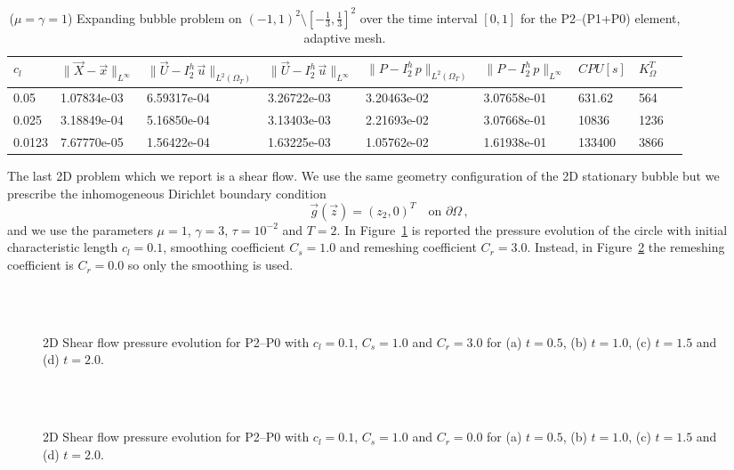 \documentclass[a4paper,12pt,onecolumn]{article}
\newcommand{\errorXx}{\|\vec{X} - \vec{x}\|_{L^\infty}}
\newcommand{\LerrorUu}[1]{\|\vec U - I^h_{#1}\,\vec u\|_{L^2(\Omega_T)}}
\newcommand{\errorUu}[1]{\|\vec U - I^h_{#1}\,\vec u\|_{L^\infty}}
\newcommand{\errorPp}[1]{\|P - I^h_{#1}\,p\|_{L^\infty}}
\newcommand{\LerrorPp}[1]{\|P - I^h_{#1}\,p\|_{L^2(\Omega_T)}}
\begin{document}
\begin{table}
 \center
 \hspace*{-2cm}
\begin{tabular}{lllllllll}
\hline
$c_l$ & $\errorXx$ & $\LerrorUu2$ & $\errorUu2$ & $\LerrorPp2$ & $\errorPp2$ & $CPU[s]$ & $K_\Omega^T$\\
\hline
0.05 & 1.07834e-03 & 6.59317e-04 & 3.26722e-03 & 3.20463e-02 & 3.07658e-01 & 631.62 & 564\\
0.025 & 3.18849e-04 & 5.16850e-04 & 3.13403e-03 & 2.21693e-02 & 3.07668e-01 & 10836 & 1236\\
0.0123 & 7.67770e-05 & 1.56422e-04 & 1.63225e-03 & 1.05762e-02 & 1.61938e-01 & 133400 & 3866\\
\hline
\end{tabular}
\hspace*{-2cm}
\caption{($\mu=\gamma=1$) Expanding bubble problem on $(-1,1)^2\setminus[-\frac{1}{3},\frac{1}{3}]^2$ over the time interval $[0,1]$ for the P2--(P1+P0) element, adaptive mesh.}
\label{tab:expandingbubble2Dp2p1p0adaptive}
\end{table}

The last 2D problem which we report is a shear flow. We use the same geometry configuration of the 2D stationary bubble but we prescribe the inhomogeneous Dirichlet boundary condition
\begin{equation*}
\vec g(\vec z)=(z_2,0)^T\quad \mbox{on }\partial\Omega\,,
\end{equation*}
and we use the parameters $\mu=1$, $\gamma=3$, $\tau=10^{-2}$ and $T=2$. In Figure~\ref{fig:shear_2d} is reported the pressure evolution of the circle with initial characteristic length $c_l=0.1$, smoothing coefficient $C_s=1.0$ and remeshing coefficient $C_r=3.0$. Instead, in Figure~\ref{fig:shear_2d_smooth} the remeshing coefficient is $C_r=0.0$ so only the smoothing is used.
\begin{figure}[htbp]
  \centering
  \quad
  \\
  \quad
  \\
  \caption{2D Shear flow pressure evolution for P2--P0 with $c_l=0.1$, $C_s=1.0$ and $C_r=3.0$ for (a) $t=0.5$, (b) $t=1.0$, (c) $t=1.5$ and (d) $t=2.0$.}
  \label{fig:shear_2d}
\end{figure}

\begin{figure}[htbp]
  \centering
  \quad
  \\
  \quad
  \\
  \caption{2D Shear flow pressure evolution for P2--P0 with $c_l=0.1$, $C_s=1.0$ and $C_r=0.0$ for (a) $t=0.5$, (b) $t=1.0$, (c) $t=1.5$ and (d) $t=2.0$.}
  \label{fig:shear_2d_smooth}
\end{figure}
\end{document}
